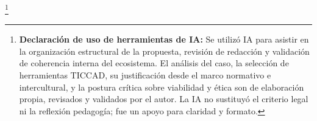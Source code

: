 ﻿\documentclass[
  spanish,
  letterpaper, oneside
]{article}
\begin{document}
\clearpage
\nocite{unadmSitioWeb,unadmMallaDerecho2024,vygotsky1978mind,johnsonJohnson1999learning,unescoDigitalLiteracy2018,unescoInterculturalCompetences2013,unescoGenerativeAI2023,bertely2011interaprendizajes,pech2016manual,scjn2022protocolo,borges2007estudiante,aguadoSleeter2021educacion,gascheMendoza2012sociedad,unesco1998declaracion}



\footnote{\small \textbf{Declaración de uso de herramientas de IA:} 
Se utilizó IA para asistir en la organización estructural de la propuesta, revisión de redacción 
y validación de coherencia interna del ecosistema. El análisis del caso, la selección de herramientas 
TICCAD, su justificación desde el marco normativo e intercultural, y la postura crítica sobre 
viabilidad y ética son de elaboración propia, revisados y validados por el autor. La IA no sustituyó 
el criterio legal ni la reflexión pedagogía; fue un apoyo para claridad y formato.}
\end{document}
